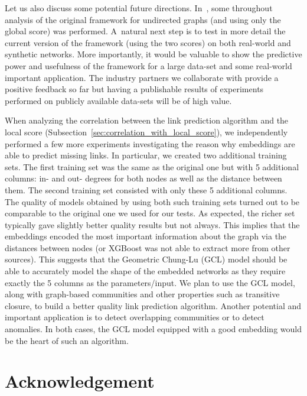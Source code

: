 \documentclass[11pt]{article}
\begin{document}
\medskip

Let us also discuss some potential future directions. In~\cite{Arash}, some throughout analysis of the original framework for undirected graphs (and using only the global score) was performed. A~natural next step is to test in more detail the current version of the framework (using the two scores) on both real-world and synthetic networks. More importantly, it would be valuable to show the predictive power and usefulness of the framework for a large data-set and some real-world important application. The industry partners we collaborate with provide a positive feedback so far but having a publishable results of experiments performed on publicly available data-sets will be of high value. 

When analyzing the correlation between the link prediction algorithm and the local score (Subsection~\ref{sec:correlation_with_local_score}), we independently performed a few more experiments investigating the reason why embeddings are able to predict missing links. In particular, we created two additional training sets. The first training set was the same as the original one but with 5 additional columns: in- and out- degrees for both nodes as well as the distance between them. The second training set consisted with only these 5 additional columns. The quality of models obtained by using both such training sets turned out to be comparable to the original one we used for our tests. As expected, the richer set typically gave slightly better quality results but not always. This implies that the embeddings encoded the most important information about the graph via the distances between nodes (or XGBoost was not able to extract more from other sources). This suggests that the Geometric Chung-Lu (GCL) model should be able to accurately model the shape of the embedded networks as they require exactly the 5 columns as the parameters/input. We plan to use the GCL model, along with graph-based communities and other properties such as transitive closure, to build a better quality link prediction algorithm. Another potential and important application is to detect overlapping communities or to detect anomalies. In both cases, the GCL model equipped with a good embedding would be the heart of such an algorithm.

\section{Acknowledgement}
\end{document}
